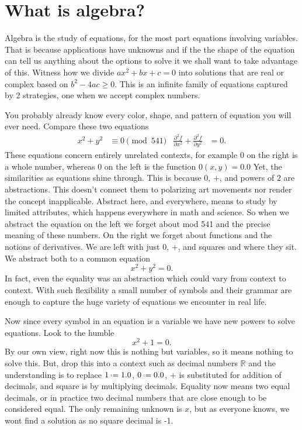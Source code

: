 \chapter{What is algebra?}

Algebra is the study of equations, for the most part equations involving variables.
That is because applications have unknowns and if the
the shape of the equation can tell us anything about the 
options to solve it we shall want to take advantage of this.
Witness how we divide $ax^2+bx+c=0$ into solutions that are 
real or complex based on $b^2-4ac\geq 0$.  This is an infinite family 
of equations captured by 2 strategies, one when we accept complex numbers.

You probably already know every color, shape, and pattern of 
equation you will ever need.  Compare these two equations
\begin{align*}
    x^2+y^2 & \equiv 0 \pmod{541} 
    & 
    \frac{\partial^2 f}{\partial x^2}+\frac{\partial^2 f}{\partial y^2} & =0.
\end{align*}
These equations concern entirely unrelated contexts, for example $0$ on the
right is a whole number, whereas $0$ on the left is the function $0(x,y)=0.0$
Yet, the similarities as equations shine through.  This is because $0$, 
$+$, and  powers of $2$ are abstractions.  This doesn't connect them to
polarizing art movements nor render the concept inapplicable.  Abstract here,
and everywhere, means to study by limited attributes, which happens everywhere
in math and science.  So when we abstract the equation on the left we forget
about mod 541 and the precise meaning of these numbers.  On the right we forget
about functions and the notions of derivatives.  We are left with just $0$, 
$+$, and squares and where they sit.  We abstract both to a common equation
\[
    x^2+y^2=0.
\]
In fact, even the equality was an abstraction which could vary from context to context.
With such flexibility a small number of symbols and their grammar are enough to capture 
the huge variety of equations we encounter in real life.

Now since every symbol in an equation is a variable we have new powers 
to solve equations.  Look to the humble 
\[
    x^2+1=0.
\]
By our own view, right now this is nothing but variables, so it means nothing to
solve this.  But, drop this into a context such as decimal numbers $\mathbb{R}$
and the understanding is to replace $1\defeq 1.0$, $0\defeq 0.0$, $+$ is
substituted for addition of decimals, and square is by multiplying decimals.
Equality now means two equal decimals, or in practice two decimal numbers that are close enough 
to be considered equal.  The only remaining unknown is $x$, but as everyone 
knows, we wont find a solution as no square decimal is -1.

